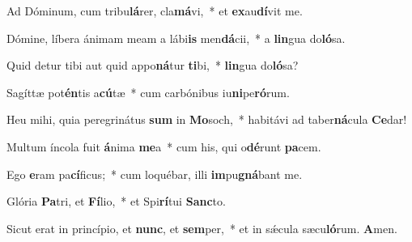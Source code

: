 \item Ad Dóminum, cum tribu\textbf{lá}rer, cla\textbf{má}vi,~* et \textbf{ex}au\textbf{dí}vit me.

\item Dómine, líbera ánimam meam a lábi\textbf{is} men\textbf{dá}cii,~* a \textbf{lin}gua do\textbf{ló}sa.

\item Quid detur tibi aut quid appo\textbf{ná}tur \textbf{ti}bi,~* \textbf{lin}gua do\textbf{ló}sa?

\item Sagíttæ pot\textbf{én}tis a\textbf{cú}tæ~* cum carbónibus iu\textbf{ni}pe\textbf{ró}rum.

\item Heu mihi, quia peregrinátus \textbf{sum} in \textbf{Mo}soch,~* habitávi ad taber\textbf{ná}cula \textbf{Ce}dar!

\item Multum íncola fuit \textbf{á}nima \textbf{me}a~* cum his, qui o\textbf{dé}runt \textbf{pa}cem.

\item Ego \textbf{e}ram pa\textbf{cí}ficus;~* cum loquébar, illi \textbf{im}pu\textbf{gná}bant me.

\item Glória \textbf{Pa}tri, et \textbf{Fí}lio,~* et Spi\textbf{rí}tui \textbf{Sanc}to.

\item Sicut erat in princípio, et \textbf{nunc}, et \textbf{sem}per,~* et in sǽcula sæcu\textbf{ló}rum. \textbf{A}men.